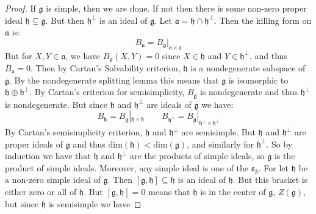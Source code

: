     \begin{proof}
        If $\mathfrak{g}$ is simple, then we are done. If not then there is
        some non-zero proper ideal $\mathfrak{h}\subsetneq\mathfrak{g}$.
        But then $\mathfrak{h}^{\perp}$ is an ideal of $\mathfrak{g}$. Let
        $\mathfrak{a}=\mathfrak{h}\cap\mathfrak{h}^{\perp}$. Then the
        killing form on $\mathfrak{a}$ is:
        \begin{equation}
            B_{\mathfrak{a}}
            =B_{\mathfrak{g}}|_{\mathfrak{a}\times\mathfrak{a}}
        \end{equation}
        But for $X,Y\in\mathfrak{a}$, we have $B_{\mathfrak{g}}(X,Y)=0$
        since $X\in\mathfrak{h}$ and $Y\in\mathfrak{h}^{\perp}$, and thus
        $B_{\mathfrak{a}}=0$. Then by Cartan's Solvability criterion,
        $\mathfrak{h}$ is a nondegenerate subspace of $\mathfrak{g}$. By the
        nondegenerate splitting lemma this means that $\mathfrak{g}$ is
        isomorphic to $\mathfrak{h}\oplus\mathfrak{h}^{\perp}$. By
        Cartan's criterion for semisimplicity, $B_{\mathfrak{g}}$ is
        nondegenerate and thus $\mathfrak{h}^{\perp}$ is nondegenerate.
        But since $\mathfrak{h}$ and $\mathfrak{h}^{\perp}$ are ideals of
        $\mathfrak{g}$ we have:
        \begin{equation}
            B_{\mathfrak{h}}
            =B_{\mathfrak{g}}|_{\mathfrak{h}\times\mathfrak{h}}
            \quad\quad
            B_{\mathfrak{h}^{\perp}}
            =B_{\mathfrak{g}}
                |_{\mathfrak{h^{\perp}}\times\mathfrak{h}^{\perp}}
        \end{equation}
        By Cartan's semisimplicity criterion, $\mathfrak{h}$ and
        $\mathfrak{h}^{\perp}$ are semisimple. But $\mathfrak{h}$ and
        $\mathfrak{h}^{\perp}$ are proper ideals of $\mathfrak{g}$ and thus
        $\textrm{dim}(\mathfrak{h})<\textrm{dim}(\mathfrak{g})$, and
        similarly for $\mathfrak{h}^{\perp}$. So by induction we have that
        $\mathfrak{h}$ and $\mathfrak{h}^{\perp}$ are the products of
        simple ideals, so $\mathfrak{g}$ is the product of simple ideals.
        Moreover, any simple ideal is one of the $\mathfrak{s}_{k}$. For let
        $\mathfrak{h}$ be a non-zero simple ideal of $\mathfrak{g}$. Then
        $[\mathfrak{g},\mathfrak{h}]\subseteq\mathfrak{h}$ is an ideal of
        $\mathfrak{h}$. But this bracket is either zero or all of
        $\mathfrak{h}$. But $[\mathfrak{g},\mathfrak{h}]=0$ means that
        $\mathfrak{h}$ is in the center of $\mathfrak{g}$,
        $Z(\mathfrak{g})$, but since $\mathfrak{h}$ is semisimple we have

\end{proof}
